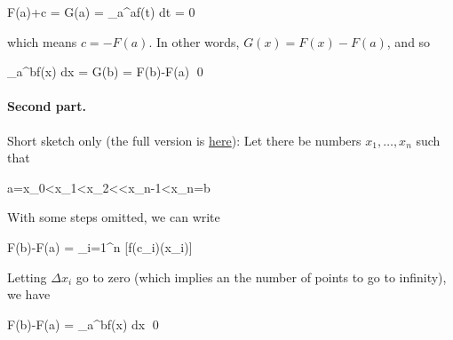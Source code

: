 \bee
F(a)+c = G(a) = \int_{a}^{a}f(t) dt = 0
\eee

which means $c = - F(a)$. In other words, $G(x) = F(x) - F(a)$, and so

\bee
\int_{a}^{b}f(x) dx = G(b) = F(b)-F(a) \qed
\eee

\paragraph{Second part.} Short sketch only (the full version is \href{https://en.wikipedia.org/wiki/Fundamental_theorem_of_calculus}{here}): Let there be numbers $x_1,\ldots,x_n$ such that

\bee
a=x_{0}<x_{1}<x_{2}<\cdots <x_{n-1}<x_{n}=b
\eee

With some steps omitted, we can write

\bee
F(b)-F(a) = \sum_{i=1}^{n} [f(c_{i})(\Delta x_{i})]
\eee

Letting $\Delta x_i$ go to zero (which implies an the number of points to go to infinity), we have

\bee
F(b)-F(a) = \int_{a}^{b}f(x) dx \qed
\eee